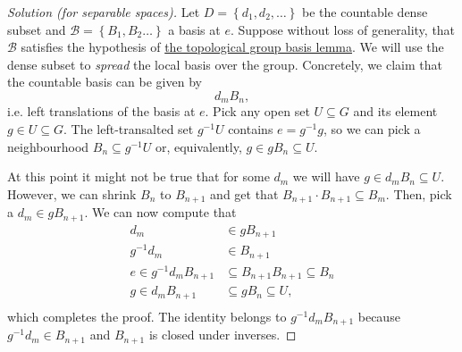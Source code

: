 
\begin{proof}[Solution (for separable spaces)]
    Let \( D = \left\{ d_1, d_2, \ldots \right\} \) be the countable dense subset and \( \mathcal{B} = \left\{ B_1, B_2 \ldots \right\} \) a basis at \( e \). Suppose without loss of generality, that \( \mathcal{B} \) satisfies the hypothesis of \hyperlink{TopGroupLocalBasis}{the topological group basis lemma}. We will use the dense subset to \emph{spread} the local basis over the group. Concretely, we claim that the countable basis can be given by
    \[ 
       d_m B_n,
   \]
   i.e. left translations of the basis at \( e \). Pick any open set \( U \subseteq G \) and its element \( g \in U \subseteq G \). The left-transalted set \( g^{-1}U \) contains \( e = g^{-1}g \), so we can pick a neighbourhood \( B_n \subseteq g^{-1}U \) or, equivalently, \( g \in gB_n \subseteq U \).

   At this point it might not be true that for some \( d_m \) we will have \( g \in d_mB_n \subseteq U \). However, we can shrink \( B_n \) to \( B_{n+1} \) and get that \( B_{n+1} \cdot B_{n+1} \subseteq B_m \). Then, pick a \( d_m \in gB_{n+1} \). We can now compute that
\begin{align*}
    d_m &\in gB_{n+1}  \\
    g^{-1}d_m &\in B_{n+1} \\
    e \in g^{-1}d_mB_{n+1} &\subseteq B_{n+1}B_{n+1}\subseteq B_n \\
    g \in d_mB_{n+1} &\subseteq gB_n \subseteq U, \\
\end{align*}
which completes the proof. The identity belongs to \( g^{-1}d_mB_{n+1} \) because \( g^{-1}d_m \in B_{n+1} \) and \( B_{n+1} \) is closed under inverses.
\end{proof}

